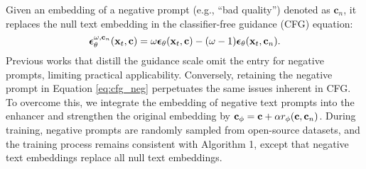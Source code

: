 Given an embedding of a negative prompt (e.g., ``bad quality'') denoted as $\mathbf{c}_n$, it replaces the null text embedding in the classifier-free guidance (CFG) equation:
\begin{equation} \label{eq:cfg_neg} 
\boldsymbol{\epsilon}_{\theta}^{\omega,\mathbf{c}_n}(\mathbf{x}_t,\mathbf{c}) = \omega \boldsymbol{\epsilon}_{\theta}(\mathbf{x}_t,\mathbf{c}) - (\omega - 1) \boldsymbol{\epsilon}_{\theta}(\mathbf{x}_t,\mathbf{c}_n). 
\end{equation}
Previous works that distill the guidance scale omit the entry for negative prompts, limiting practical applicability. Conversely, retaining the negative prompt in Equation \ref{eq:cfg_neg} perpetuates the same issues inherent in CFG. To overcome this, we integrate the embedding of negative text prompts into the enhancer and strengthen the original embedding by $\mathbf{c}_\phi = \mathbf{c} + \alpha r_{\phi}(\mathbf{c}, \mathbf{c}_n)$. During training, negative prompts are randomly sampled from open-source datasets, and the training process remains consistent with Algorithm 1, except that negative text embeddings replace all null text embeddings.